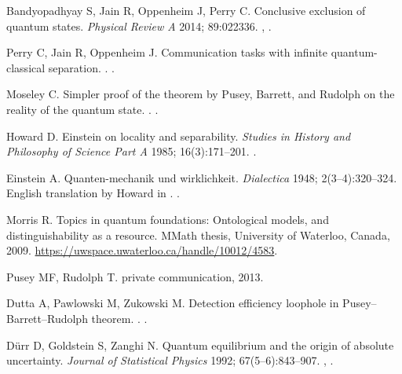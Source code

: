 \documentclass[DIV=calc,paper=a4,fontsize=11pt,twocolumn]{scrartcl} %
\theoremstyle{definition}
\theoremstyle{plain}
\begin{document}
\begin{thebibliography}{10}
Bandyopadhyay S, Jain R, Oppenheim J, Perry C.
\newblock Conclusive exclusion of quantum states.
\newblock \emph{Physical Review A} 2014; 89:022336.
\newblock \href {http://arxiv.org/abs/1306.4683} {},
\href {http://dx.doi.org/10.1103/PhysRevA.89.022336}
{}.

Perry C, Jain R, Oppenheim J.
\newblock Communication tasks with infinite quantum-classical separation.
.
\newblock \href {http://arxiv.org/abs/1407.8217} {}.

Moseley C.
\newblock Simpler proof of the theorem by Pusey, Barrett, and Rudolph on
the reality of the quantum state.
.
\newblock \href {http://arxiv.org/abs/1401.0026} {}.

Howard D.
\newblock Einstein on locality and separability.
\newblock \emph{Studies in History and Philosophy of Science Part A} 1985; 16(3):171--201.
\newblock \href {http://dx.doi.org/10.1016/0039-3681(85)90001-9}
{}.

Einstein A.
\newblock Quanten-mechanik und wirklichkeit.
\newblock \emph{Dialectica} 1948; 2(3--4):320--324.
\newblock English translation by Howard in \cite{Howard1985}.
\newblock \href {http://dx.doi.org/10.1111/j.1746-8361.1948.tb00704.x}
{}.

Morris R.
\newblock Topics in quantum foundations: Ontological models, and
distinguishability as a resource.
\newblock MMath thesis, University of Waterloo, Canada, 2009.
\newblock \url{https://uwspace.uwaterloo.ca/handle/10012/4583}.

Pusey MF, Rudolph T.
\newblock private communication, 2013.

Dutta A, Pawlowski M, Zukowski M.
\newblock Detection efficiency loophole in Pusey--Barrett--Rudolph theorem.
.
\newblock \href {http://arxiv.org/abs/1407.5577} {}.

D{\"u}rr D, Goldstein S, Zanghi N.
\newblock Quantum equilibrium and the origin of absolute uncertainty.
\newblock \emph{Journal of Statistical Physics} 1992; 67(5--6):843--907.
\newblock \href {http://arxiv.org/abs/quant-ph/0308039}
{}, \href {http://dx.doi.org/10.1007/BF01049004}
{}.


\end{thebibliography}
\end{document}

